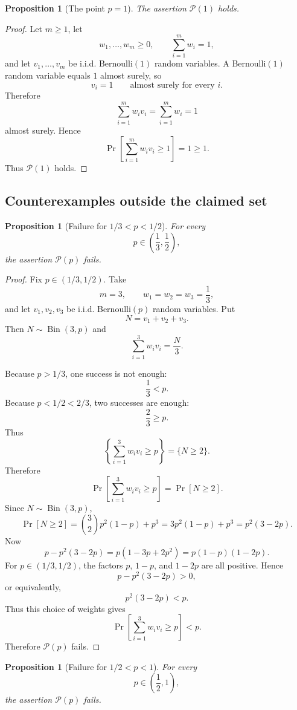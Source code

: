 \documentclass[12pt]{article}
\theoremstyle{definition}
\theoremstyle{plain}
\newtheorem{proposition}[definition]{Proposition}
\theoremstyle{remark}
\begin{document}
\begin{proposition}[The point \(p=1\)]\label{prop:onep}
The assertion \(\mathcal P(1)\) holds.
\end{proposition}

\begin{proof}
Let \(m\ge1\), let
\[
w_1,\ldots,w_m\ge0,\qquad \sum_{i=1}^{m}w_i=1,
\]
and let \(v_1,\ldots,v_m\) be i.i.d. Bernoulli\((1)\) random variables. A Bernoulli\((1)\) random variable equals \(1\) almost surely, so
\[
v_i=1\qquad\text{almost surely for every }i.
\]
Therefore
\[
\sum_{i=1}^{m}w_i v_i
=
\sum_{i=1}^{m}w_i
=
1
\]
almost surely. Hence
\[
\Pr\!\left[\sum_{i=1}^{m}w_i v_i\ge1\right]=1\ge1.
\]
Thus \(\mathcal P(1)\) holds.
\end{proof}

\subsection{Counterexamples outside the claimed set}
\begin{proposition}[Failure for \(1/3<p<1/2\)]\label{prop:countermiddle}
For every
\[
p\in\left(\frac13,\frac12\right),
\]
the assertion \(\mathcal P(p)\) fails.
\end{proposition}

\begin{proof}
Fix \(p\in(1/3,1/2)\). Take
\[
m=3,\qquad w_1=w_2=w_3=\frac13,
\]
and let \(v_1,v_2,v_3\) be i.i.d. Bernoulli\((p)\) random variables. Put
\[
N=v_1+v_2+v_3.
\]
Then \(N\sim\operatorname{Bin}(3,p)\) and
\[
\sum_{i=1}^{3}w_i v_i=\frac{N}{3}.
\]

Because \(p>1/3\), one success is not enough:
\[
\frac13<p.
\]
Because \(p<1/2<2/3\), two successes are enough:
\[
\frac23\ge p.
\]
Thus
\[
\left\{\sum_{i=1}^{3}w_i v_i\ge p\right\}
=
\{N\ge2\}.
\]
Therefore
\[
\Pr\!\left[\sum_{i=1}^{3}w_i v_i\ge p\right]
=
\Pr[N\ge2].
\]
Since \(N\sim\operatorname{Bin}(3,p)\),
\[
\Pr[N\ge2]
=
\binom{3}{2}p^2(1-p)+p^3
=
3p^2(1-p)+p^3
=
p^2(3-2p).
\]
Now
\[
p-p^2(3-2p)
=
p(1-3p+2p^2)
=
p(1-p)(1-2p).
\]
For \(p\in(1/3,1/2)\), the factors \(p\), \(1-p\), and \(1-2p\) are all positive. Hence
\[
p-p^2(3-2p)>0,
\]
or equivalently,
\[
p^2(3-2p)<p.
\]
Thus this choice of weights gives
\[
\Pr\!\left[\sum_{i=1}^{3}w_i v_i\ge p\right]<p.
\]
Therefore \(\mathcal P(p)\) fails.
\end{proof}

\begin{proposition}[Failure for \(1/2<p<1\)]\label{prop:counterlarge}
For every
\[
p\in\left(\frac12,1\right),
\]
the assertion \(\mathcal P(p)\) fails.
\end{proposition}
\end{document}
